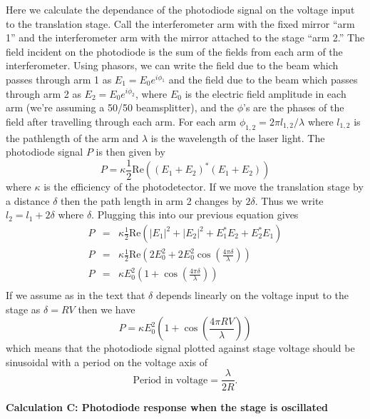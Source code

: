 \documentclass{report}
\begin{document}
Here we calculate the dependance of the photodiode signal on the voltage input to the translation stage. Call the interferometer arm with the fixed mirror ``arm 1'' and the interferometer arm with the mirror attached to the stage ``arm 2.'' The field incident on the photodiode is the sum of the fields from each arm of the interferometer. Using phasors, we can write the field due to the beam which passes through arm 1 as $E_1 = E_0 e^{i\phi_1}$ and the field due to the beam which passes through arm 2 as $E_2=E_0 e^{i\phi_2}$, where $E_0$ is the electric field amplitude in each arm (we're assuming a 50/50 beamsplitter), and the $\phi$'s are the phases of the field after travelling through each arm. For each arm $\phi_{1,2} = 2\pi l_{1,2} / \lambda$ where $l_{1,2}$ is the pathlength of the arm and $\lambda$ is the wavelength of the laser light. The photodiode signal $P$ is then given by
\begin{displaymath}
P = \kappa \frac{1}{2} \textrm{Re}((E_1+E_2)^{*}(E_1+E_2))
\end{displaymath}
where $\kappa$ is the efficiency of the photodetector. If we move the translation stage by a distance $\delta$ then the path length in arm 2 changes by $2\delta$. Thus we write $l_2 = l_1 + 2\delta$ where $\delta$. Plugging this into our previous equation gives
\begin{eqnarray*}
P &=& \kappa \frac{1}{2} \textrm{Re}(|E_1|^2+|E_2|^2+E_1^*E_2+E_2^*E_1) \\
P &=& \kappa \frac{1}{2} \textrm{Re}(2E_0^2+2E_0^2 \cos (\frac{4\pi \delta}{\lambda})) \\
P &=& \kappa E_0^2 (1 + \cos (\frac{4\pi \delta}{\lambda})) \\
\end{eqnarray*}
If we assume as in the text that $\delta$ depends linearly on the voltage input to the stage as $\delta = RV$ then we have
\begin{displaymath}
P = \kappa E_0^2 (1 + \cos (\frac{4\pi R V}{\lambda}))
\end{displaymath}
which means that the photodiode signal plotted against stage voltage should be sinusoidal with a period on the voltage axis of
\begin{displaymath}
\textrm{Period in voltage} = \frac{\lambda}{2R}.
\end{displaymath}

\newpage
\begin{center}
{\bf Calculation C: Photodiode response when the stage is oscillated}
\end{center}
\end{document}
